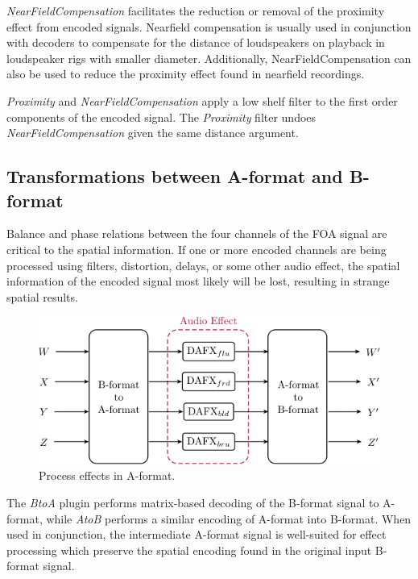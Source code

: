 \documentclass{article}
\begin{document}
\emph{NearFieldCompensation} facilitates the reduction or removal of the proximity effect from encoded signals.
Near\-field compensation is usually used in conjunction with decoders to compensate for the distance of loudspeakers on playback in loudspeaker rigs with smaller diameter.
Additionally, NearFieldCompensation can also be used to reduce the proximity effect found in nearfield recordings.

\emph{Proximity} and \emph{NearFieldCompensation} apply a low shelf filter to the first order components of the encoded signal.
The \emph{Proximity} filter undoes \emph{NearFieldCompensation} given the same distance argument.


\subsection{Transformations between A-format and B-format}\label{sec:a-format}

Balance and phase relations between the four channels of the FOA signal are critical to the spatial information.
If one or more encoded channels are being processed using filters, distortion, delays, or some other audio effect, the spatial information of the encoded signal most likely will be lost, resulting in strange spatial results.

\begin{figure}[h]
\captionsetup{aboveskip=-6pt}
\centering
\includegraphics[width=1.0\columnwidth]{figures/DAFXNetwork.png}
\setlength{\abovecaptionskip}{0pt plus 3pt minus 2pt} %
\caption{Process effects in A-format.\label{fig:aToB}}
\end{figure}



The \emph{BtoA} plugin performs matrix-based decoding of the B-format signal to A-format, while \emph{AtoB} performs a similar encoding of A-format into B-format.
When used in conjunction, the intermediate A-format signal is well-suited for effect processing which preserve the spatial encoding found in the original input B-format signal.
\end{document}
